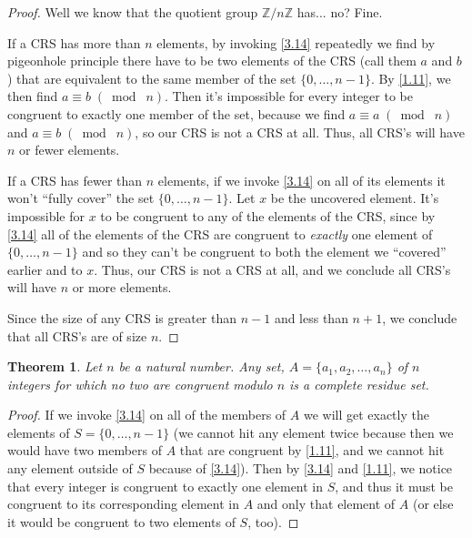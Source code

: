 \documentclass{article}
\newtheorem{thm}{Theorem}[section]
\numberwithin{equation}{thm}
\providecommand{\gmod}[1]{\; (\bmod \; #1)}
\begin{document}
\begin{proof}
  Well we know that the quotient group $\mathbb{Z} / n\mathbb{Z}$ has... no? Fine.

  If a CRS has more than $n$ elements, by invoking \ref{3.14} repeatedly we find by pigeonhole principle there have to be two elements of the CRS (call them $a$ and $b$) that are equivalent to the same member of the set $\{0, \ldots, n-1\}$. By \ref{1.11}, we then find $a \equiv b \gmod n$. Then it's impossible for every integer to be congruent to exactly one member of the set, because we find $a \equiv a \gmod n$ and $a \equiv b \gmod n$, so our CRS is not a CRS at all. Thus, all CRS's will have $n$ or fewer elements.

  If a CRS has fewer than $n$ elements, if we invoke \ref{3.14} on all of its elements it won't ``fully cover'' the set $\{0, \ldots, n-1\}$. Let $x$ be the uncovered element. It's impossible for $x$ to be congruent to any of the elements of the CRS, since by \ref{3.14} all of the elements of the CRS are congruent to \emph{exactly} one element of $\{0, \ldots, n-1\}$ and so they can't be congruent to both the element we ``covered'' earlier and to $x$. Thus, our CRS is not a CRS at all, and we conclude all CRS's will have $n$ or more elements.

  Since the size of any CRS is greater than $n-1$ and less than $n+1$, we conclude that all CRS's are of size $n$.
\end{proof}



\begin{thm} \label{3.17}
  Let $n$ be a natural number. Any set, $A = \{a_1, a_2, \ldots, a_n\}$ of $n$ integers for which no two are congruent modulo $n$ is a complete residue set.
\end{thm}

\begin{proof}
  If we invoke \ref{3.14} on all of the members of $A$ we will get exactly the elements of $S = \{0, \ldots, n-1\}$ (we cannot hit any element twice because then we would have two members of $A$ that are congruent by \ref{1.11}, and we cannot hit any element outside of $S$ because of \ref{3.14}). Then by \ref{3.14} and \ref{1.11}, we notice that every integer is congruent to exactly one element in $S$, and thus it must be congruent to its corresponding element in $A$ and only that element of $A$ (or else it would be congruent to two elements of $S$, too). 
\end{proof}
\end{document}
